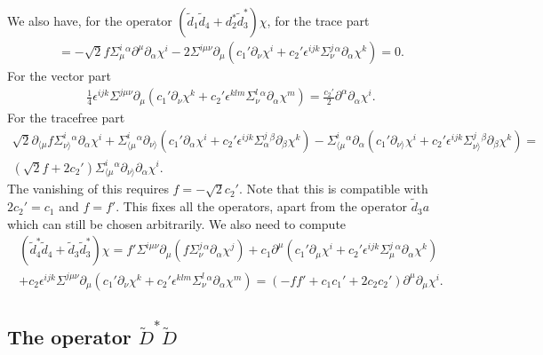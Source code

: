 \documentclass[10pt]{report}
\theoremstyle{definition}
\begin{document}
We also have, for the operator $(\tilde{d}_1 \tilde{d}_4 + d_2^* \tilde{d}_3^*)\chi$, for the trace part
\begin{align}
=  - \sqrt{2} f\Sigma_\mu^i{}^\alpha \partial^\mu \partial_\alpha \chi^i    -2 \Sigma^{i\mu\nu} \partial_\mu (c_1' \partial_\nu \chi^i + c_2' \epsilon^{ijk} \Sigma^j_\nu{}^\alpha \partial_\alpha \chi^k)=0.
\end{align}
For the vector part
\begin{align}
\frac{1}{4} \epsilon^{ijk} \Sigma^{j\mu\nu} \partial_\mu (c_1' \partial_\nu \chi^k + c_2' \epsilon^{klm} \Sigma^l_\nu{}^\alpha \partial_\alpha \chi^m)= \frac{c_2'}{2} \partial^\alpha \partial_\alpha \chi^i.
\end{align}
For the tracefree part
\begin{align}\nonumber
\sqrt{2} \partial_{\langle\mu} f\Sigma_{\nu\rangle}^i{}^\alpha \partial_\alpha \chi^i + \Sigma^i_{\langle\mu}{}^\alpha \partial_{\nu\rangle}(c_1' \partial_\alpha \chi^i + c_2' \epsilon^{ijk} \Sigma^j_\alpha{}^\beta \partial_\beta \chi^k)
-\Sigma^i_{\langle\mu}{}^\alpha \partial_\alpha (c_1' \partial_{\nu\rangle} \chi^i + c_2' \epsilon^{ijk} \Sigma^j_{\nu\rangle}{}^\beta \partial_\beta \chi^k)=\\ \nonumber
(\sqrt{2} f+2c_2') \Sigma^i_{\langle\mu}{}^\alpha \partial_{\nu\rangle} \partial_\alpha \chi^i.
\end{align}
The vanishing of this requires $f=-\sqrt{2} c_2'$. Note that this is compatible with $2 c_2' = c_1$ and $f=f'$. This fixes all the operators, apart from the operator $\tilde{d}_3 a$ which can still be chosen arbitrarily. We also need to compute
\begin{align}
(\tilde{d}_4^* \tilde{d}_4 + \tilde{d}_3 \tilde{d}_3^*) \chi = f' \Sigma^{i\mu\nu} \partial_\mu ( f \Sigma^j_\nu{}^\alpha \partial_\alpha \chi^j) + c_1 \partial^\mu ( c_1' \partial_\mu \chi^i + c_2' \epsilon^{ijk} \Sigma^j_\mu{}^\alpha \partial_\alpha \chi^k) \\ \nonumber
+ c_2 \epsilon^{ijk} \Sigma^{j\mu\nu} \partial_\mu ( c_1' \partial_\nu \chi^k + c_2' \epsilon^{klm} \Sigma^l_\nu{}^\alpha \partial_\alpha \chi^m)
= (-ff' +c_1 c_1' + 2c_2 c_2') \partial^\mu \partial_\mu \chi^i.
\end{align}

\subsection{The operator \texorpdfstring{$\tilde{D}^* \tilde{D}$}{}}
\end{document}
